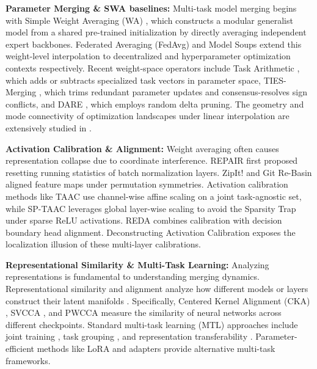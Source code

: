 \documentclass{article}
\begin{document}
\textbf{Parameter Merging \& SWA baselines:} Multi-task model merging begins with Simple Weight Averaging (WA) \cite{izmailov2018averaging}, which constructs a modular generalist model from a shared pre-trained initialization by directly averaging independent expert backbones. Federated Averaging (FedAvg) \cite{pmlr-v54-mcmahan17a} and Model Soups \cite{wortsman2022model} extend this weight-level interpolation to decentralized and hyperparameter optimization contexts respectively. Recent weight-space operators include Task Arithmetic \cite{ilharco2023editing}, which adds or subtracts specialized task vectors in parameter space, TIES-Merging \cite{yadav2023ties}, which trims redundant parameter updates and consensus-resolves sign conflicts, and DARE \cite{yu2024language}, which employs random delta pruning. The geometry and mode connectivity of optimization landscapes under linear interpolation are extensively studied in \cite{fort2019deep, garipov2018loss, draxler2018essentially, benton2021loss, frankle2018lottery, nagarajan2019uniform}.

\textbf{Activation Calibration \& Alignment:} Weight averaging often causes representation collapse due to coordinate interference. REPAIR \cite{jordan2023repair} first proposed resetting running statistics of batch normalization layers. ZipIt! \cite{stoica2024zipit} and Git Re-Basin \cite{ainsworth2023git} aligned feature maps under permutation symmetries. Activation calibration methods like TAAC \cite{taac2026} use channel-wise affine scaling on a joint task-agnostic set, while SP-TAAC \cite{sp_taac2026} leverages global layer-wise scaling to avoid the Sparsity Trap under sparse ReLU activations. REDA \cite{reda2026} combines calibration with decision boundary head alignment. Deconstructing Activation Calibration \cite{submission3} exposes the localization illusion of these multi-layer calibrations.

\textbf{Representational Similarity \& Multi-Task Learning:} Analyzing representations is fundamental to understanding merging dynamics. Representational similarity and alignment analyze how different models or layers construct their latent manifolds \cite{mu2020representation, lenc2015understanding, li2015convergent, wang2020representational, sucholutsky2023getting, neyshabur2020what}. Specifically, Centered Kernel Alignment (CKA) \cite{kornblith2019similarity}, SVCCA \cite{raghu2017svcca}, and PWCCA \cite{morcos2018insights} measure the similarity of neural networks across different checkpoints. Standard multi-task learning (MTL) approaches include joint training \cite{caruana1997multitask, ruder2017overview, evgeniou2004regularized}, task grouping \cite{fifty2021efficiently, standley2020which}, and representation transferability \cite{zamir2018taskonomy}. Parameter-efficient methods like LoRA \cite{hu2021lora} and adapters \cite{houlsby2019parameter} provide alternative multi-task frameworks.
\end{document}
